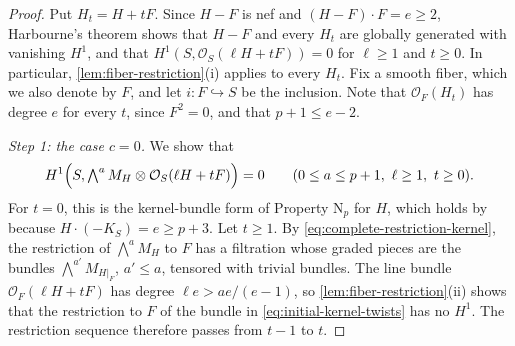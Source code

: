 \documentclass[11pt,reqno]{amsart}
\numberwithin{equation}{section}
\theoremstyle{remark}
\newcommand{\sshf}[1]{\mathcal{O}_{#1}}
\newcommand{\NP}{\mathrm N}
\begin{document}
\begin{proof}
Put \(H_t=H+tF\). Since \(H-F\) is nef and \((H-F)\cdot F=e\geq2\), Harbourne's theorem shows that \(H-F\) and every \(H_t\) are globally generated with vanishing \(H^1\), and that \(H^1(S,\sshf{S}(\ell H+tF))=0\) for \(\ell\geq1\) and \(t\geq0\). In particular, \cref{lem:fiber-restriction}\textup{(i)} applies to every \(H_t\). Fix a smooth fiber, which we also denote by \(F\), and let \(i\colon F\hookrightarrow S\) be the inclusion. Note that \(\sshf{F}(H_t)\) has degree \(e\) for every \(t\), since \(F^2=0\), and that \(p+1\leq e-2\).

\smallskip\noindent\emph{Step 1: the case \(c=0\).} We show that
\begin{equation}\label{eq:initial-kernel-twists}
 H^1\Bigl(S,\textstyle\bigwedge^aM_H\otimes\sshf{S}(\ell H+tF)\Bigr)=0
 \qquad(0\leq a\leq p+1,\ \ell\geq1,\ t\geq0).
\end{equation}
For \(t=0\), this is the kernel-bundle form of Property \(\NP_p\) for \(H\), which holds by \cite[Theorem 1.3]{GP01} because \(H\cdot(-K_S)=e\geq p+3\). Let \(t\geq1\). By \eqref{eq:complete-restriction-kernel}, the restriction of \(\bigwedge^aM_H\) to \(F\) has a filtration whose graded pieces are the bundles \(\bigwedge^{a'}M_{H|_F}\), \(a'\leq a\), tensored with trivial bundles. The line bundle \(\sshf{F}(\ell H+tF)\) has degree \(\ell e>ae/(e-1)\), so \cref{lem:fiber-restriction}\textup{(ii)} shows that the restriction to \(F\) of the bundle in \eqref{eq:initial-kernel-twists} has no \(H^1\). The restriction sequence therefore passes from \(t-1\) to \(t\).


\end{proof}
\end{document}
